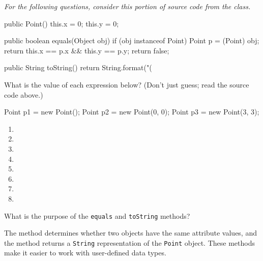 \vspace{2em}
\hrulefill

\vspace{1ex}
\textit{For the following questions, consider this portion of source code from the  class.}
\vspace{1ex}

\begin{javalst}
    public Point() {
        this.x = 0;
        this.y = 0;
    }

    public boolean equals(Object obj) {
        if (obj instanceof Point) {
            Point p = (Point) obj;
            return this.x == p.x && this.y == p.y;
        }
        return false;
    }

    public String toString() {
        return String.format("(%
    }
\end{javalst}



\Q \label{expr}
What is the value of each expression below? (Don't just guess; read the source code above.)
\begin{javalst}
Point p1 = new Point();  Point p2 = new Point(0, 0);  Point p3 = new Point(3, 3);
\end{javalst}

\begin{multicols}{2}
\setlength{\defaultwidth}{5em}
\begin{enumerate}[itemsep=1pt]
\item {} 
\item {} 
\item {} 
\item {} 
\item {} 
\item {} 
\item {} 
\item {} 
\end{enumerate}
\end{multicols}


\Q What is the purpose of the \texttt{equals} and \texttt{toString} methods?

\begin{answer}[5em]
The  method determines whether two objects have the same attribute values, and the  method returns a \texttt{String} representation of the \texttt{Point} object.
These methods make it easier to work with user-defined data types.
\end{answer}


